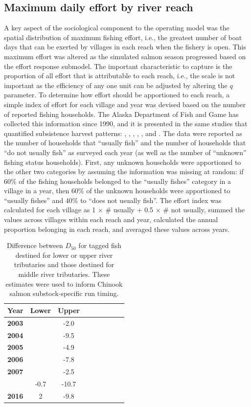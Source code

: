 \documentclass[12pt,]{book}
\theoremstyle{definition}
\theoremstyle{definition}
\theoremstyle{definition}
\theoremstyle{remark}
\begin{document}
\subsection{Maximum daily effort by river reach}\label{mse-data-effort}

\noindent
A key aspect of the sociological component to the operating model was
the spatial distribution of maximum fishing effort, i.e., the greatest
number of boat days that can be exerted by villages in each reach when
the fishery is open. This maximum effort was altered as the simulated
salmon season progressed based on the effort response submodel. The
important characteristic to capture is the proportion of all effort that
is attributable to each reach, i.e., the scale is not important as the
efficiency of any one unit can be adjusted by altering the \(q\)
parameter. To determine how effort should be apportioned to each reach,
a simple index of effort for each village and year was devised based on
the number of reported fishing households. The Alaska Department of Fish
and Game has collected this information since 1990, and it is presented
in the same studies that quantified subsistence harvest patterns:
\citet{hamazaki-2011}, \citet{carroll-hamazaki-2012},
\citet{shelden-etal-2014}, \citet{shelden-etal-2015},
\citet{shelden-etal-2016a}, and \citet{shelden-etal-2016b}. The data
were reported as the number of households that ``usually fish'' and the
number of households that ``do not usually fish'' as surveyed each year
(as well as the number of ``unknown'' fishing status households). First,
any unknown households were apportioned to the other two categories by
assuming the information was missing at random: if 60\% of the fishing
households belonged to the ``usually fishes'' category in a village in a
year, then 60\% of the unknown households were apportioned to ``usually
fishes'' and 40\% to ``does not usually fish''. The effort index was
calculated for each village as 1 \(\times\) \# usually + 0.5 \(\times\)
\# not usually, summed the values across villages within each reach and
year, calculated the annual proportion belonging in each reach, and
averaged these values across years.

\clearpage
\singlespacing

\begin{longtable}[t]{>{\bfseries}lcclcclcc}
\caption{\label{tab:d50-devs-table}Difference between $D_{50}$ for tagged fish destined for lower or upper river tributaries and those destined for middle river tributaries. These estimates were used to inform Chinook salmon substock-specific run timing.}\\
\toprule
\textbf{Year} & \textbf{Lower} & \textbf{Upper}\\
\midrule
2003 &  & -2.0\\
2004 &  & -9.5\\
2005 &  & -4.9\\
2006 &  & -7.8\\
2007 &  & -2.5\\
\addlinespace
2015 & -0.7 & -10.7\\
2016 & 2 & -9.8\\
\bottomrule
\end{longtable}
\end{document}
